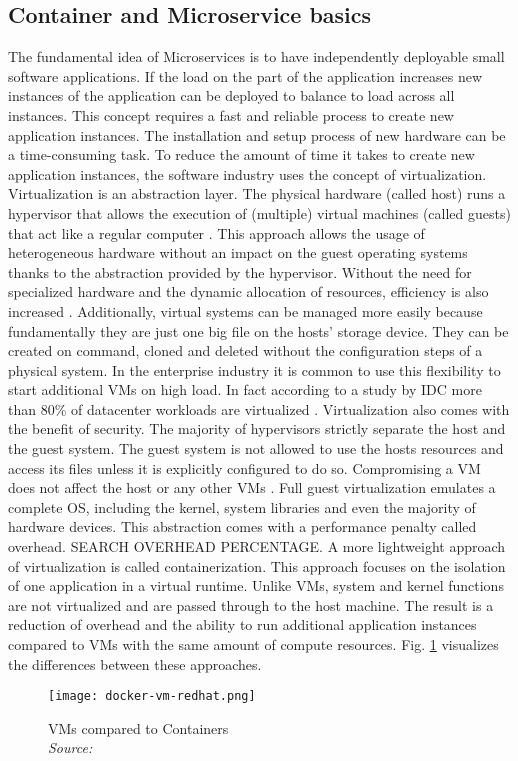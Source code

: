 \documentclass[12pt, a4paper]{article}
\begin{document}
    \subsection{Container and Microservice basics}
    The fundamental idea of Microservices is to have independently deployable small software applications. If the load on the part of the application increases new instances of the application can be deployed to balance to load across all instances. This concept requires a fast and reliable process to create new application instances.\newline
    The installation and setup process of new hardware can be a time-consuming task. To reduce the amount of time it takes to create new application instances, the software industry uses the concept of virtualization.\newline
    Virtualization is an abstraction layer. The physical hardware (called host) runs a hypervisor that allows the execution of (multiple) virtual machines (called guests) that act like a regular computer \cite{vmbasics}. This approach allows the usage of heterogeneous hardware without an impact on the guest operating systems thanks to the abstraction provided by the hypervisor. Without the need for specialized hardware and the dynamic allocation of resources, efficiency is also increased \cite{redhat_venv}. Additionally, virtual systems can be managed more easily because fundamentally they are just one big file on the hosts' storage device. They can be created on command, cloned and deleted without the configuration steps of a physical system. In the enterprise industry it is common to use this flexibility to start additional \ac{VM}s on high load. In fact according to a study by \ac{IDC} more than 80\% of datacenter workloads are virtualized \cite{virtualaddoption}. Virtualization also comes with the benefit of security. The majority of hypervisors strictly separate the host and the guest system. The guest system is not allowed to use the hosts resources and access its files unless it is explicitly configured to do so. Compromising a \ac{VM} does not affect the host or any other \ac{VM}s \cite{redhat_venv}.\newline
    Full guest virtualization emulates a complete \ac{OS}, including the kernel, system libraries  and even the majority of hardware devices. This abstraction comes with a performance penalty called overhead. SEARCH OVERHEAD PERCENTAGE. A more lightweight approach of virtualization is called containerization. This approach focuses on the isolation of one application in a virtual runtime. Unlike \ac{VM}s, system and kernel functions are not virtualized and are passed through to the host machine. The result is a reduction of overhead and the ability to run additional application instances compared to \ac{VM}s with the same amount of compute resources. Fig. \ref{fig::vm_docker} visualizes the differences between these approaches.
    \begin{figure}
        \centering
        \texttt{[image: docker-vm-redhat.png]}
        \caption{\ac{VM}s compared to Containers \\\textit{Source: \cite{redhat_pic}}}\label{fig::vm_docker}
    \end{figure}
\end{document}
